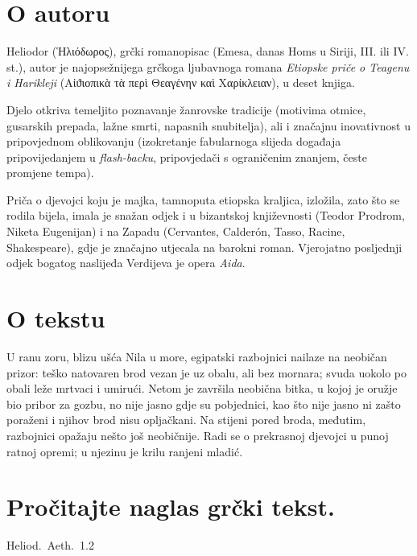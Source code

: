 \section*{O autoru}

Heliodor \textgreek[variant=ancient]{(Ἡλιόδωρος),} grčki romanopisac (Emesa, danas Homs u Siriji, III. ili IV. st.), autor je najopsežnijega grčkoga ljubavnoga romana \textit{Etiopske priče o Teagenu i Harikleji} \textgreek[variant=ancient]{(Αἰϑιοπικὰ τὰ περὶ Θεαγένην καὶ Χαρίκλειαν),} u deset knjiga. 

Djelo otkriva temeljito poznavanje žanrovske tradicije (motivima otmice, gusarskih prepada, lažne smrti, napasnih snubitelja), ali i značajnu inovativnost u pripovjednom oblikovanju (izokretanje fabularnoga slijeda događaja pripovijedanjem u \textit{flash-backu}, pripovjedači s ograničenim znanjem, česte promjene tempa). 

Priča o djevojci koju je majka, tamnoputa etiopska kraljica, izložila, zato što se rodila bijela, imala je snažan odjek i u bizantskoj književnosti (Teodor Prodrom, Niketa Eugenijan) i na Zapadu (Cervantes, Calderón, Tasso, Racine, Shakespeare), gdje je značajno utjecala na barokni roman. Vjerojatno posljednji odjek bogatog naslijeđa Verdijeva je opera \textit{Aida}.

\section*{O tekstu}

U ranu zoru, blizu ušća Nila u more, egipatski razbojnici nailaze na neobičan prizor: teško natovaren brod vezan je uz obalu, ali bez mornara; svuda uokolo po obali leže mrtvaci i umirući. Netom je završila neobična bitka, u kojoj je oružje bio pribor za gozbu, no nije jasno gdje su pobjednici, kao što nije jasno ni zašto poraženi i njihov brod nisu opljačkani. Na stijeni pored broda, međutim, razbojnici opažaju nešto još neobičnije. Radi se o prekrasnoj djevojci u punoj ratnoj opremi; u njezinu je krilu ranjeni mladić.


\section*{Pročitajte naglas grčki tekst.}

Heliod.\ Aeth.\ 1.2


\medskip

